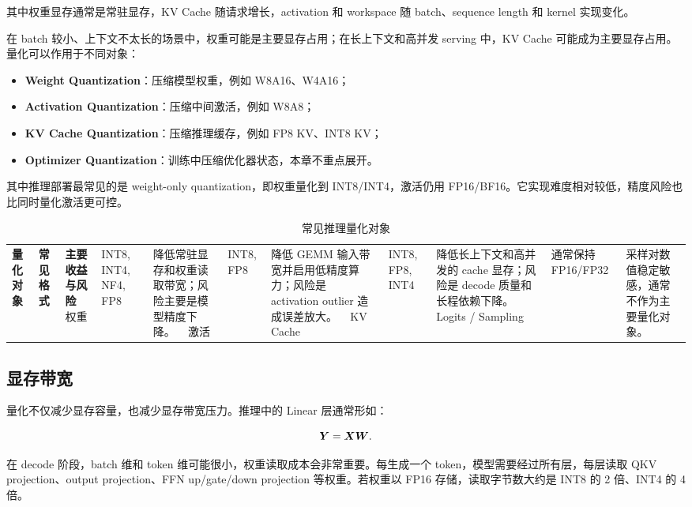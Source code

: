 其中权重显存通常是常驻显存，KV Cache 随请求增长，activation 和 workspace 随 batch、sequence length 和 kernel 实现变化。

在 batch 较小、上下文不太长的场景中，权重可能是主要显存占用；在长上下文和高并发 serving 中，KV Cache 可能成为主要显存占用。量化可以作用于不同对象：

\begin{itemize}
\item \textbf{Weight Quantization}：压缩模型权重，例如 W8A16、W4A16；
\item \textbf{Activation Quantization}：压缩中间激活，例如 W8A8；
\item \textbf{KV Cache Quantization}：压缩推理缓存，例如 FP8 KV、INT8 KV；
\item \textbf{Optimizer Quantization}：训练中压缩优化器状态，本章不重点展开。
\end{itemize}

其中推理部署最常见的是 weight-only quantization，即权重量化到 INT8/INT4，激活仍用 FP16/BF16。它实现难度相对较低，精度风险也比同时量化激活更可控。

\begin{table}[H]
\centering
\small
\caption{常见推理量化对象}
\label{tab:quantization-targets}
\begin{tabular}{p{}p{}p{}}
\toprule
\textbf{量化对象} & \textbf{常见格式} & \textbf{主要收益与风险} \
\midrule
权重
& INT8, INT4, NF4, FP8
& 降低常驻显存和权重读取带宽；风险主要是模型精度下降。 \
\midrule
激活
& INT8, FP8
& 降低 GEMM 输入带宽并启用低精度算力；风险是 activation outlier 造成误差放大。 \
\midrule
KV Cache
& INT8, FP8, INT4
& 降低长上下文和高并发的 cache 显存；风险是 decode 质量和长程依赖下降。 \
\midrule
Logits / Sampling
& 通常保持 FP16/FP32
& 采样对数值稳定敏感，通常不作为主要量化对象。 \
\bottomrule
\end{tabular}
\end{table}

\subsection{显存带宽}
\label{subsec:memory-bandwidth}

量化不仅减少显存容量，也减少显存带宽压力。推理中的 Linear 层通常形如：

\[
\bm{Y}=\bm{X}\bm{W}.
\]

在 decode 阶段，batch 维和 token 维可能很小，权重读取成本会非常重要。每生成一个 token，模型需要经过所有层，每层读取 QKV projection、output projection、FFN up/gate/down projection 等权重。若权重以 FP16 存储，读取字节数大约是 INT8 的 2 倍、INT4 的 4 倍。

